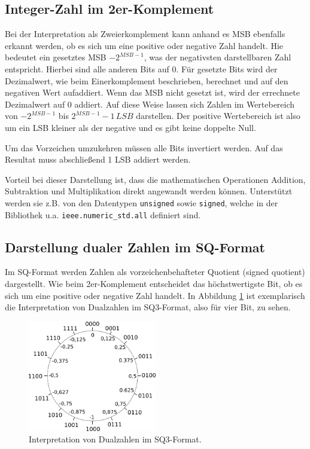 \subsection{Integer-Zahl im 2er-Komplement}\label{sec:Integer2erKomplement}

Bei der Interpretation als Zweierkomplement kann anhand es MSB ebenfalls erkannt werden, ob es sich um eine positive oder negative Zahl handelt. 
Hie bedeutet ein gesetztes MSB $-2^{MSB-1}$, was der negativsten darstellbaren Zahl entspricht. Hierbei sind alle anderen 
Bits auf 0. Für gesetzte Bits wird der Dezimalwert, wie beim Einerkomplement beschrieben, berechnet und auf den negativen Wert aufaddiert. Wenn das MSB nicht gesetzt
ist, wird der errechnete Dezimalwert auf 0 addiert. Auf diese Weise lassen sich Zahlen im Wertebereich von $-2^{MSB-1}$ bis $2^{MSB-1}-1 \,LSB$ darstellen. Der positive
Wertebereich ist also um ein LSB kleiner als der negative und es gibt keine doppelte Null.

Um das Vorzeichen umzukehren müssen alle Bits invertiert werden. Auf das Resultat muss abschließend 1 LSB addiert werden.

Vorteil bei dieser Darstellung ist, dass die mathematischen Operationen Addition, Subtraktion und Multiplikation direkt angewandt werden können. Unterstützt werden sie z.B. 
von den Datentypen \texttt{unsigned} sowie \texttt{signed}, welche in der Bibliothek u.a. \texttt{ieee.numeric\_std.all} definiert sind.


\subsection{Darstellung dualer Zahlen im SQ-Format}
Im SQ-Format werden Zahlen als vorzeichenbehafteter Quotient (signed quotient) dargestellt. Wie beim 2er-Komplement entscheidet das höchstwertigste Bit, ob es sich um eine
positive oder negative Zahl handelt. In Abbildung \ref{pic:SQKreis} ist exemplarisch die Interpretation von Dualzahlen im SQ3-Format, also für vier Bit, zu sehen.

\begin{figure}[ht!]
 \centering
 \includegraphics[width=0.5\textwidth]{img/SQ-Kreis.png}
 \caption{Interpretation von Dualzahlen im SQ3-Format.}
 \label{pic:SQKreis}
\end{figure}



